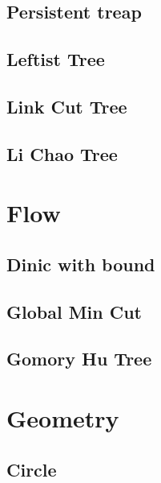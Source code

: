 \documentclass[a4paper,10pt,twocolumn,oneside]{article}
\begin{document}
\subsection{Persistent treap}


\subsection{Leftist Tree}


\subsection{Link Cut Tree}


\subsection{Li Chao Tree}


\section{Flow}
\subsection{Dinic with bound}


%

\subsection{Global Min Cut}


\subsection{Gomory Hu Tree}


\section{Geometry}
\subsection{Circle}

\end{document}
